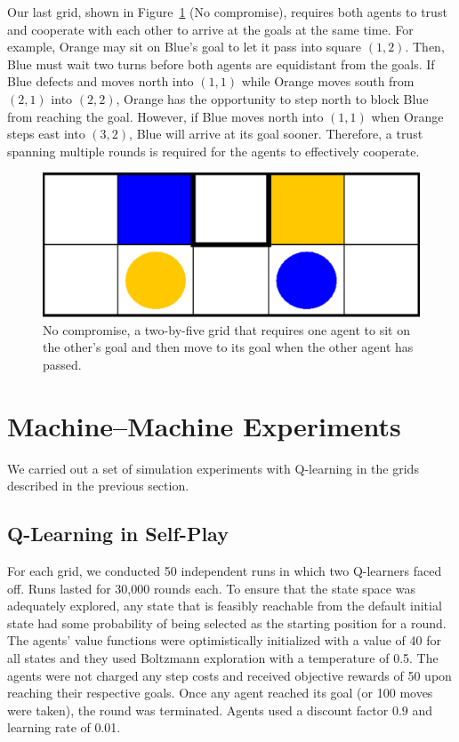 \documentclass[letterpaper]{article}
\begin{document}
Our last grid, shown in Figure~\ref{fig:nocompromise} (No compromise),
requires both agents to trust and cooperate with each other to arrive
at the goals at the same time. For example, Orange may sit
on Blue's goal to let it pass into square $(1,2)$. Then, 
Blue must wait two turns before both agents are equidistant from
the goals. If Blue defects and moves north into $(1,1)$
while Orange moves south from $(2,1)$ into $(2,2)$, Orange
has the opportunity to step north to block Blue from reaching the
goal. However, if Blue moves north into $(1,1)$ when Orange steps east
into $(3,2)$, Blue will arrive at its goal sooner. Therefore, a trust
spanning multiple rounds is required for the agents to effectively
cooperate.

\begin{figure}
\centering
\includegraphics[width=0.71\columnwidth]{figures/nocompromise.png}
\caption{No compromise, a two-by-five grid that requires one agent to
sit on the other's goal and then move to its goal when the other agent
has passed.}
\label{fig:nocompromise}
\end{figure}

\section{Machine--Machine Experiments}

We carried out a set of simulation experiments with Q-learning in
the grids described in the previous section.

\subsection{Q-Learning in Self-Play}


For each grid, we conducted 50 independent runs in which two
Q-learners faced off. Runs lasted for 30,000 rounds each. To ensure
that the state space was adequately explored, any state that is
feasibly reachable from the default initial state had some probability
of being selected as the starting position for a round. The agents'
value functions were optimistically initialized with a value of 40 for
all states and they used Boltzmann exploration with a temperature of
0.5. The agents were not charged any step costs and received objective
rewards of 50 upon reaching their respective goals. Once any agent
reached its goal (or 100 moves were taken), the round was terminated.
Agents used a discount factor $0.9$ and learning rate of 0.01.
\end{document}
